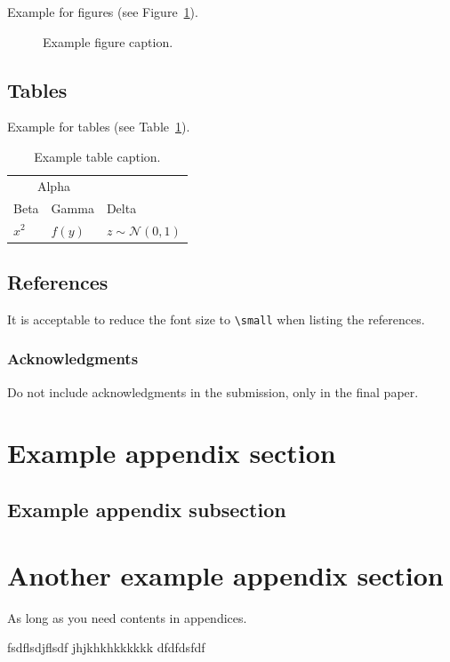 \documentclass{article}
\begin{document}
Example for figures (see Figure~\ref{fig:example}).

\begin{figure}[h]
  \centering
  \fbox{\rule[-.5cm]{0cm}{2cm} \rule[-.5cm]{5cm}{0cm}}
  \caption{Example figure caption.}
  \label{fig:example}
\end{figure}

\subsection{Tables}

Example for tables (see Table~\ref{table:example}).

\begin{table}[h]
  \caption{Example table caption.}
  \label{table:example}
  \centering
  \begin{tabular}{lll}
    \toprule
    \multicolumn{2}{c}{Alpha}                   \\
    \cmidrule(r){1-2}
    Beta     & Gamma     & Delta \\
    \midrule
    $x^2$     & $f(y)$ & $z \sim \mathcal{N}(0, 1)$      \\
    \bottomrule
  \end{tabular}
\end{table}

\subsection{References}

It is acceptable to reduce the font size to \verb+\small+ when listing the 
references.

\subsubsection*{Acknowledgments}

Do not include acknowledgments in the submission, only in the final paper.

\clearpage
\small



\clearpage
\normalsize
\appendix
\section{Example appendix section}
\subsection{Example appendix subsection}
\section{Another example appendix section}

As long as you need contents in appendices.

fsdflsdjflsdf
jhjkhkhkkkkkk
dfdfdsfdf
\end{document}
